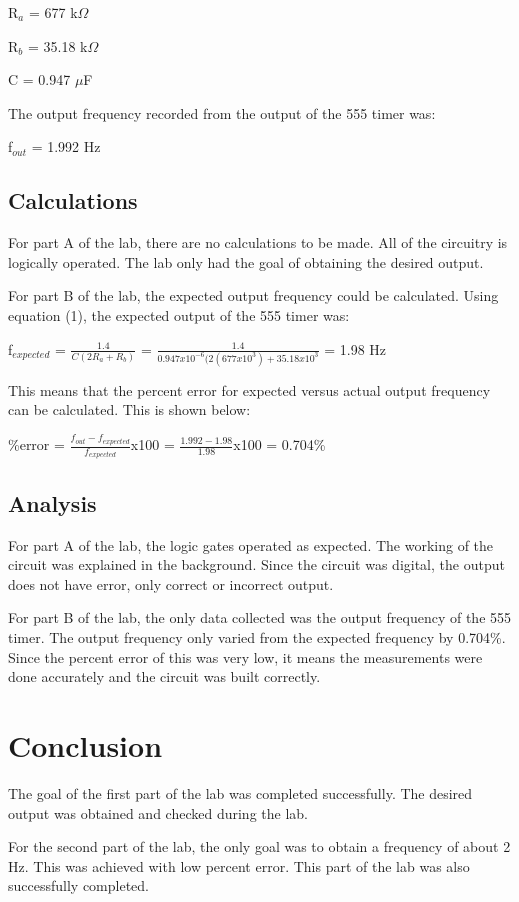 \documentclass[twocolumn, amsmath]{revtex4}
\begin{document}
R$_a$ = 677 k$\Omega$

R$_b$ = 35.18 k$\Omega$

C = 0.947 $\mu$F

The output frequency recorded from the output of the 555 timer was:

f$_{out}$ = 1.992 Hz

\subsection{Calculations}
For part A of the lab, there are no calculations to be made. All of the circuitry is logically operated. The lab only had the goal of obtaining the desired output.

For part B of the lab, the expected output frequency could be calculated. %
Using equation (1), the expected output of the 555 timer was:

f$_{expected}$ = $\frac{1.4}{C(2R_a + R_b)}$ = $\frac{1.4}{0.947x10^{-6}(2(677x10^3) + 35.18x10^3}$ = 1.98 Hz

This means that the percent error for expected versus actual output frequency can be calculated. This is shown below:

\%error = $\frac{f_{out} - f_{expected}}{f_{expected}}$x100 = $\frac{1.992 - 1.98}{1.98}$x100 = 0.704\%

\subsection{Analysis}
For part A of the lab, the logic gates operated as expected. The working of the circuit was explained in the background. Since the circuit was digital, the output does not have error, only correct or incorrect output.

For part B of the lab, the only data collected was the output frequency of the 555 timer. The output frequency only varied from the expected frequency by 0.704\%. Since the percent error of this was very low, it means the measurements were done accurately and the circuit was built correctly.





\section{Conclusion}
The goal of the first part of the lab was completed successfully. The desired output was obtained and checked during the lab.

For the second part of the lab, the only goal was to obtain a frequency of about 2 Hz. This was achieved with low percent error. This part of the lab was also successfully completed.
\end{document}
